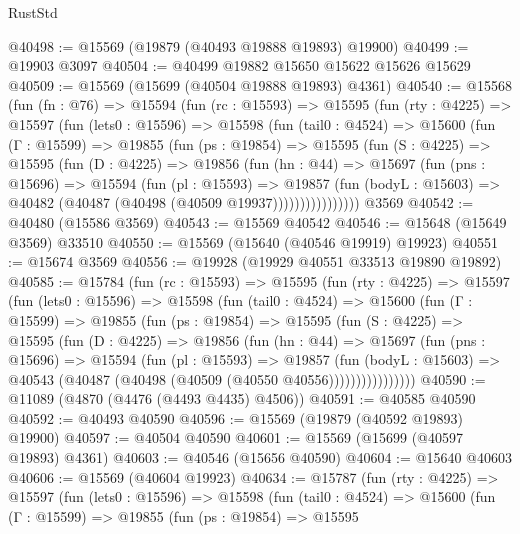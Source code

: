 \begin{lexlean}{RustStd}
\begin{coremodule}
@40498 := @15569 (@19879 (@40493 @19888 @19893) @19900)
@40499 := @19903 @3097
@40504 := @40499 @19882 @15650 @15622 @15626 @15629
@40509 := @15569 (@15699 (@40504 @19888 @19893) @4361)
@40540 := @15568
    (fun (fn : @76) =>
    @15594
      (fun (rc : @15593) =>
      @15595
        (fun (rty : @4225) =>
        @15597
          (fun (lets0 : @15596) =>
          @15598
            (fun (tail0 : @4524) =>
            @15600
              (fun (Γ : @15599) =>
              @19855
                (fun (ps : @19854) =>
                @15595
                  (fun (S : @4225) =>
                  @15595
                    (fun (D : @4225) =>
                    @19856
                      (fun (hn : @44) =>
                      @15697
                        (fun (pns : @15696) =>
                        @15594
                          (fun (pl : @15593) =>
                          @19857
                            (fun (bodyL : @15603) =>
                            @40482 (@40487 (@40498 (@40509 @19937))))))))))))))))
    @3569
@40542 := @40480 (@15586 @3569)
@40543 := @15569 @40542
@40546 := @15648 (@15649 @3569) @33510
@40550 := @15569 (@15640 (@40546 @19919) @19923)
@40551 := @15674 @3569
@40556 := @19928 (@19929 @40551 @33513 @19890 @19892)
@40585 := @15784
    (fun (rc : @15593) =>
    @15595
      (fun (rty : @4225) =>
      @15597
        (fun (lets0 : @15596) =>
        @15598
          (fun (tail0 : @4524) =>
          @15600
            (fun (Γ : @15599) =>
            @19855
              (fun (ps : @19854) =>
              @15595
                (fun (S : @4225) =>
                @15595
                  (fun (D : @4225) =>
                  @19856
                    (fun (hn : @44) =>
                    @15697
                      (fun (pns : @15696) =>
                      @15594
                        (fun (pl : @15593) =>
                        @19857
                          (fun (bodyL : @15603) =>
                          @40543 (@40487 (@40498 (@40509 (@40550 @40556))))))))))))))))
@40590 := @11089 (@4870 (@4476 (@4493 @4435) @4506))
@40591 := @40585 @40590
@40592 := @40493 @40590
@40596 := @15569 (@19879 (@40592 @19893) @19900)
@40597 := @40504 @40590
@40601 := @15569 (@15699 (@40597 @19893) @4361)
@40603 := @40546 (@15656 @40590)
@40604 := @15640 @40603
@40606 := @15569 (@40604 @19923)
@40634 := @15787
    (fun (rty : @4225) =>
    @15597
      (fun (lets0 : @15596) =>
      @15598
        (fun (tail0 : @4524) =>
        @15600
          (fun (Γ : @15599) =>
          @19855
            (fun (ps : @19854) =>
            @15595

\end{coremodule}
\end{lexlean}
